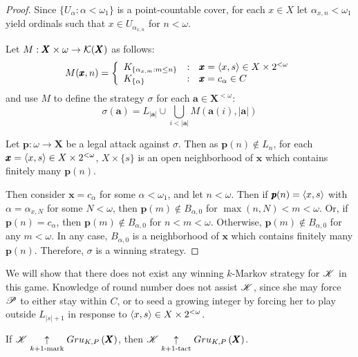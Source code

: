\begin{proof}
  Since $\{U_\alpha:\alpha<\omega_1\}$ is a point-countable cover,
  for each $x\in X$ let $\alpha_{x,n}<\omega_1$ yield
  ordinals such that $x\in U_{\alpha_{x,n}}$ for $n<\omega$.

  Let $M:\pmb X\times \omega\to \mathcal{K}(\pmb X)$ as follows:
    \[
      M(\pmb x,n)
        =
      \left\{
        \begin{array}{lcl}
          K_{\{\alpha_{x,m}:m\leq n\}}
        & : &
          \pmb x = \langle x,s\rangle \in X\times 2^{<\omega}
        \\
          K_{\{\alpha\}}
        & : &
          \pmb x = c_\alpha \in C
        \end{array}
      \right.
    \]
  and use $M$ to define the strategy $\sigma$ for each $\pmb a\in\pmb X^{<\omega}$:
    \[
      \sigma(\pmb a)
        =
      L_{|\pmb a|}
        \cup
      \bigcup_{i< |\pmb a|}
      M(\pmb a(i),|\pmb a|)
    \]

  Let $\pmb p:\omega\to\pmb X$ be a legal attack against $\sigma$. Then as
  $\pmb p(n)\not\in L_n$, for each $\pmb x=\langle x,s\rangle\in X\times 2^{<\omega}$,
  $X\times\{s\}$ is an open neighborhood of $\pmb x$ which contains finitely
  many $\pmb p(n)$.

  Then consider $\pmb x=c_\alpha$ for some $\alpha<\omega_1$, and let $n<\omega$.
  Then if $\pmb p(n)=\langle x,s\rangle$ with $\alpha = \alpha_{x,N}$ for some $N<\omega$,
  then $\pmb p(m)\not\in B_{\alpha,0}$ for $\max(n,N)<m<\omega$.
  Or, if $\pmb p(n)=c_\alpha$, then
  $\pmb p(m)\not\in B_{\alpha,0}$ for $n<m<\omega$.
  Otherwise, $\pmb p(m)\not\in B_{\alpha,0}$ for any $m<\omega$.
  In any case, $B_{\alpha,0}$ is a neighborhood of $\pmb x$ which contains finitely
  many $\pmb p(n)$. Therefore, $\sigma$ is a winning strategy.
\end{proof}

We will show that there does not exist any winning $k$-Markov strategy for
$\mathscr{K}$ in this game. Knowledge of round number does not assist $\mathscr{K}$,
since she may force $\mathscr{P}$ to either stay within $C$, or to seed a growing
integer by forcing her to play outside $L_{|s|+1}$ in response to
$\langle x,s\rangle\in X\times 2^{<\omega}$.

\begin{lem}
  If $\mathscr{K}\underset{k+1\text{-mark}}{\uparrow}Gru_{K,P}\left({\pmb X}\right)$, then
  $\mathscr{K}\underset{k+1\text{-tact}}{\uparrow}Gru_{K,P}\left({\pmb X}\right)$.
\end{lem}

